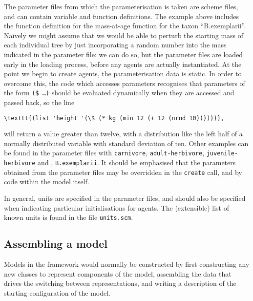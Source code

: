 The parameter files from which the parameterisation is taken are
scheme files, and can contain variable and function definitions.  The
example above includes the function definition for the mass-at-age
function for the taxon ``B.exemplarii''.  Na\"ively we might assume
that we would be able to perturb the starting mass of each individual
tree by just incorporating a random number into the mass indicated in
the parameter file: we can do so, but the parameter
files are loaded early in the loading process, before any agents are
actually instantiated.  At the point we begin to create agents,
the parameterisation data is static.  In order to overcome this, the
code which accesses parameters recognises that parameters of the form
\texttt{(\$ \ldots )} should be evaluated dynamically when they are
accessed and passed back, so the line
\begin{verbatim}
\texttt{(list 'height '(\$ (* kg (min 12 (+ 12 (nrnd 10))))))},
\end{verbatim}
will return a value greater than twelve, with a distribution like the
left half of a normally distributed variable with standard deviation
of ten.  Other examples can be found in the parameter files with
\texttt{carnivore}, \texttt{adult-herbivore},
\texttt{juvenile-herbivore} and , \texttt{B.exemplarii}. 
It should be emphasised that the parameters obtained from the
parameter files may be overridden in the \texttt{create} call, and by
code within the model itself.

In general, units are specified in the parameter
files, and should also be specified when indicating particular
initialisations for agents.  The (extensible) list of known units is
found in the file \texttt{units.scm}.






\subsection{Assembling a model}
Models in the framework would normally be constructed by first
constructing any new classes to represent components of the model,
assembling the data that drives the switching between representations,
and writing a description of the starting configuration of the model. 

